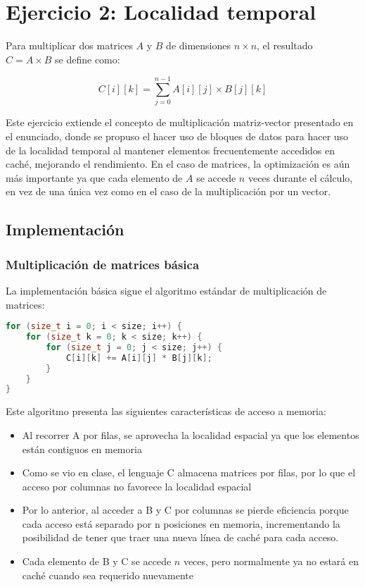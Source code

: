 \documentclass{article}
\begin{document}
\section{Ejercicio 2: Localidad temporal}
Para multiplicar dos matrices $A$ y $B$ de dimensiones $n \times n$, el resultado $C = A \times B$ se define como:

\[ C[i][k] = \sum_{j=0}^{n-1} A[i][j] \times B[j][k] \]

Este ejercicio extiende el concepto de multiplicación matriz-vector presentado en el enunciado, donde se propuso el hacer uso de bloques de datos para hacer uso de la localidad temporal al mantener elementos frecuentemente accedidos en caché, mejorando el rendimiento. En el caso de matrices, la optimización es aún más importante ya que cada elemento de $A$ se accede $n$ veces durante el cálculo, en vez de una única vez como en el caso de la multiplicación por un vector.

\subsection{Implementación}

\subsubsection{Multiplicación de matrices básica}
La implementación básica sigue el algoritmo estándar de multiplicación de matrices:

\begin{lstlisting}[style=cpp,language=C++]
for (size_t i = 0; i < size; i++) {
    for (size_t k = 0; k < size; k++) {
        for (size_t j = 0; j < size; j++) {
            C[i][k] += A[i][j] * B[j][k];
        }
    }
}
\end{lstlisting}

Este algoritmo presenta las siguientes características de acceso a memoria:

\begin{itemize}[noitemsep]
    \item Al recorrer A por filas, se aprovecha la localidad espacial ya que los elementos están contiguos en memoria
    \item Como se vio en clase, el lenguaje C almacena matrices por filas, por lo que el acceso por columnas no favorece la localidad espacial
    \item Por lo anterior, al acceder a B y C por columnas se pierde eficiencia porque cada acceso está separado por n posiciones en memoria, incrementando la posibilidad de tener que traer una nueva línea de caché para cada acceso.
    \item Cada elemento de B y C se accede $n$ veces, pero normalmente ya no estará en caché cuando sea requerido nuevamente
\end{itemize}
\end{document}
